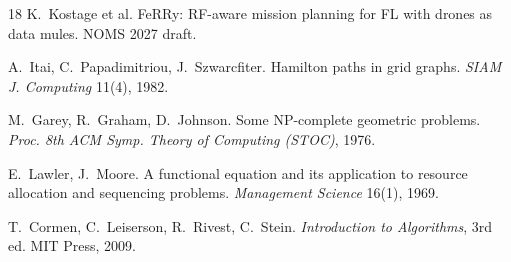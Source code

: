 \begin{thebibliography}{18}
K.~Kostage et al.
FeRRy: RF-aware mission planning for FL with drones as data mules.
NOMS 2027 draft.

A.~Itai, C.~Papadimitriou, J.~Szwarcfiter.
Hamilton paths in grid graphs.
\emph{SIAM J. Computing} 11(4), 1982.

M.~Garey, R.~Graham, D.~Johnson.
Some NP-complete geometric problems.
\emph{Proc. 8th ACM Symp. Theory of Computing (STOC)}, 1976.

E.~Lawler, J.~Moore.
A functional equation and its application to resource allocation and
sequencing problems.
\emph{Management Science} 16(1), 1969.

T.~Cormen, C.~Leiserson, R.~Rivest, C.~Stein.
\emph{Introduction to Algorithms}, 3rd ed.
MIT Press, 2009.

\end{thebibliography}
